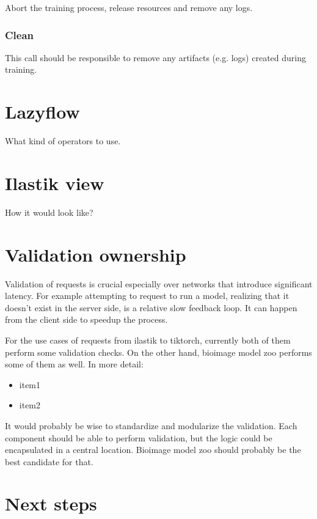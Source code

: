 \documentclass[12pt, a4paper]{article}
\begin{document}
Abort the training process, release resources and remove any logs.

\subsubsection{Clean}

This call should be responsible to remove any artifacts (e.g. logs) created during training.

\section{Lazyflow}

What kind of operators to use.

\section{Ilastik view}

How it would look like?

\section{Validation ownership}
\label{sec:validation}

Validation of requests is crucial especially over networks that introduce significant latency. For example attempting to request to run a model, realizing that it doesn't exist in the server side, is a relative slow feedback loop. It can happen from the client side to speedup the process.

For the use cases of requests from ilastik to tiktorch, currently both of them perform some validation checks. On the other hand, bioimage model zoo performs some of them as well. In more detail:

\begin{itemize}
    \itemsep -0.2em
    \item item1
    \item item2
\end{itemize}


It would probably be wise to standardize and modularize the validation. Each component should be able to perform validation, but the logic could be encapsulated in a central location. Bioimage model zoo should probably be the best candidate for that. 

\section{Next steps}
\label{sec:next_steps}
\end{document}

